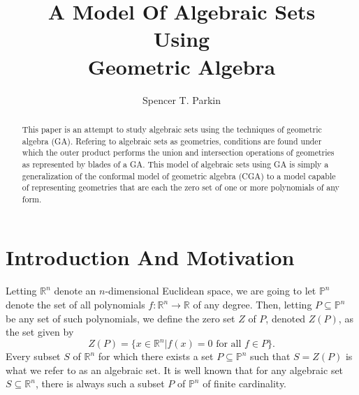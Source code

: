 \documentclass{birkjour}
\theoremstyle{definition}
\theoremstyle{remark}
\numberwithin{equation}{section}
\newcommand{\R}{\mathbb{R}}
\newcommand{\Poly}{\mathbb{P}}
\begin{document}
\title{A Model Of Algebraic Sets\\Using\\Geometric Algebra}

\author{Spencer T. Parkin}





\begin{abstract}
This paper is an attempt to study algebraic sets using
the techniques of geometric algebra (GA).  Refering to
algebraic sets as geometries, conditions are
found under which the outer product performs the
union and intersection operations of geometries as
represented by blades of a GA.
This model of algebraic sets using GA
is simply a generalization of the conformal model of
geometric algebra (CGA) to a model capable of representing
geometries that are each the zero set of one or more
polynomials of any form.
\end{abstract}

\maketitle

\section{Introduction And Motivation}

Letting $\R^n$ denote an $n$-dimensional Euclidean space, we are
going to let $\Poly^n$ denote the set of all polynomials $f:\R^n\to\R$
of any degree.  Then, letting $P\subseteq\Poly^n$ be any set of such
polynomials, we define the zero set $Z$ of $P$, denoted $Z(P)$,
as the set given by
\begin{equation}\label{equ_zero_set_of_polys}
Z(P) = \{x\in\R^n|\mbox{$f(x)=0$ for all $f\in P$}\}.
\end{equation}
Every subset $S$ of $\R^n$ for which there exists a set $P\subseteq\Poly^n$
such that $S=Z(P)$ is what we refer to as an algebraic set.  It is well known
that for any algebraic set $S\subseteq\R^n$, there is always such a subset $P$
of $\Poly^n$ of finite cardinality.
\end{document}
